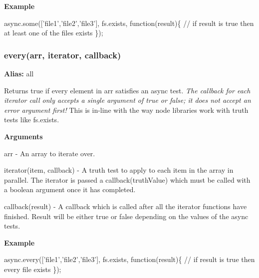 {\bfseries Example}


\begin{DoxyCode}
async.some([\textcolor{stringliteral}{'file1'},\textcolor{stringliteral}{'file2'},\textcolor{stringliteral}{'file3'}], fs.exists, \textcolor{keyword}{function}(result)\{
    \textcolor{comment}{// if result is true then at least one of the files exists}
\});
\end{DoxyCode}
 



\label{_every}%
 \subsubsection*{every(arr, iterator, callback)}

{\bfseries Alias\+:} {\ttfamily all}

Returns {\ttfamily true} if every element in {\ttfamily arr} satisfies an async test. {\itshape The callback for each {\ttfamily iterator} call only accepts a single argument of {\ttfamily true} or {\ttfamily false}; it does not accept an error argument first!} This is in-\/line with the way node libraries work with truth tests like {\ttfamily fs.\+exists}.

{\bfseries Arguments}


\begin{DoxyItemize}
\item {\ttfamily arr} -\/ An array to iterate over.
\item {\ttfamily iterator(item, callback)} -\/ A truth test to apply to each item in the array in parallel. The iterator is passed a callback(truth\+Value) which must be called with a boolean argument once it has completed.
\item {\ttfamily callback(result)} -\/ A callback which is called after all the {\ttfamily iterator} functions have finished. Result will be either {\ttfamily true} or {\ttfamily false} depending on the values of the async tests.
\end{DoxyItemize}

{\bfseries Example}


\begin{DoxyCode}
async.every([\textcolor{stringliteral}{'file1'},\textcolor{stringliteral}{'file2'},\textcolor{stringliteral}{'file3'}], fs.exists, \textcolor{keyword}{function}(result)\{
    \textcolor{comment}{// if result is true then every file exists}
\});
\end{DoxyCode}
 



